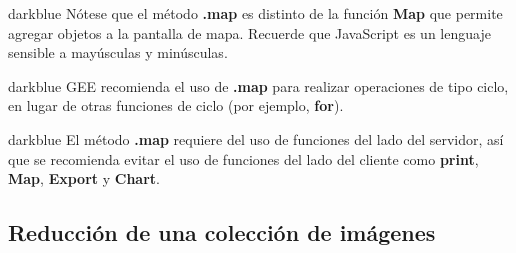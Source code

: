 \documentclass[
  12pt,
  letterpaper,
  twoside]{book}
\newcommand\boldpurple[1]{\textcolor{darkpurple}{\textbf{#1}}}
\begin{document}
\begin{bluebox2}

\begin{awesomeblock}{5pt}{\faLightbulb}{darkblue}
Nótese que el método \boldpurple{.map} es distinto de la función \boldpurple{Map} que permite agregar objetos a la pantalla de mapa. Recuerde que JavaScript es un lenguaje sensible a mayúsculas y minúsculas.

\end{awesomeblock}

\end{bluebox2}

\begin{bluebox2}

\begin{awesomeblock}{5pt}{\faLightbulb}{darkblue}
GEE recomienda el uso de \boldpurple{.map} para realizar operaciones de tipo ciclo, en lugar de otras funciones de ciclo (por ejemplo, \boldpurple{for}).

\end{awesomeblock}

\end{bluebox2}

\begin{bluebox2}

\begin{awesomeblock}{5pt}{\faLightbulb}{darkblue}
El método \boldpurple{.map} requiere del uso de funciones del lado del servidor, así que se recomienda evitar el uso de funciones del lado del cliente como \boldpurple{print}, \boldpurple{Map}, \boldpurple{Export} y \boldpurple{Chart}.

\end{awesomeblock}

\end{bluebox2}

\hypertarget{reducciuxf3n-de-una-colecciuxf3n-de-imuxe1genes}{%
\subsection*{Reducción de una colección de imágenes}\label{reducciuxf3n-de-una-colecciuxf3n-de-imuxe1genes}}
\end{document}
